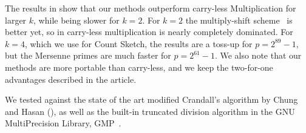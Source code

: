 The results in  show that our methods outperform carry-less Multiplication for larger $k$, while being slower for $k=2$.
For $k=2$ the multiply-shift scheme~\cite{dietzfel96universal} is better yet, so in carry-less multiplication is nearly completely dominated.
For $k=4$, which we use for Count Sketch, the results are a toss-up for $p=2^{89}-1$, but the Mersenne primes are much faster for $p=2^{61}-1$.
We also note that our methods are more portable than carry-less, and we keep the two-for-one advantages described in the article.
\vspace{.5em} %

We tested  against the state of the art modified Crandall's algorithm by Chung and Hasan (), as well as the built-in truncated division algorithm in the GNU MultiPrecision Library, GMP~\cite{granlund2010gnu}.

